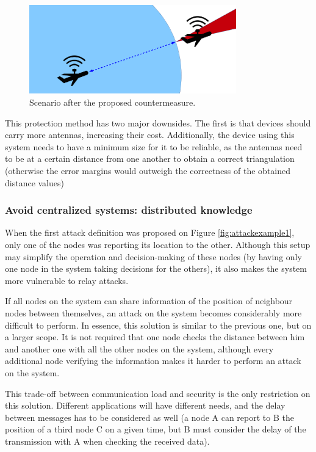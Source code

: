 \documentclass{article}
\begin{document}
  \begin{figure}[h!]
  \centering
    \includegraphics[width=0.8\textwidth]{images/attack3.png}
  \caption{Scenario after the proposed countermeasure.}
  \label{fig:attackexample3}
\end{figure}

This protection method has two major downsides. The first is that devices should carry more antennas, increasing their cost. Additionally, the device using this system needs to have a minimum size for it to be reliable, as the antennas need to be at a certain distance from one another to obtain a correct triangulation (otherwise the error margins would outweigh the correctness of the obtained distance values)

\subsubsection{Avoid centralized systems: distributed knowledge}

When the first attack definition was proposed on Figure \ref{fig:attackexample1}, only one of the nodes was reporting its location to the other. Although this setup may simplify the operation and decision-making of these nodes (by having only one node in the system taking decisions for the others), it also makes the system more vulnerable to relay attacks.

If all nodes on the system can share information of the position of neighbour nodes between themselves, an attack on the system becomes considerably more difficult to perform. In essence, this solution is similar to the previous one, but on a larger scope. It is not required that one node checks the distance between him and another one with all the other nodes on the system, although every additional node verifying the information makes it harder to perform an attack on the system.

This trade-off between communication load and security is the only restriction on this solution. Different applications will have different needs, and the delay between messages has to be considered as well (a node A can report to B the position of a third node C on a given time, but B must consider the delay of the transmission with A when checking the received data).
\end{document}
